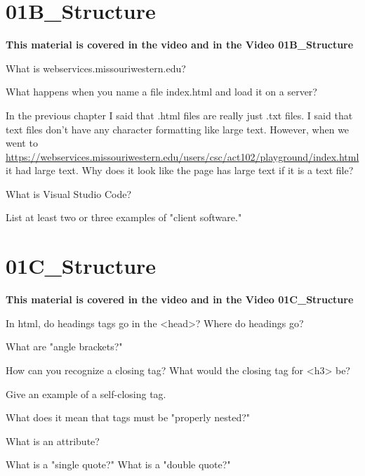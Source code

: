 \documentclass[letterpaper,12pt]{exam}
\begin{document}
\section*{01B\_Structure}
\begin{center}
	\textbf{This material is covered in the video and in the Video 01B\_Structure}
\end{center}
\begin{questions}

\question  What is webservices.missouriwestern.edu?
\vspace{1.5cm}

\question What happens when you name a file index.html and load it on a server? 
\vspace{1.5cm}

\question In the previous chapter I said that .html files are really just .txt files.  I said that text files don't have any character formatting like large text.  
However, when we went to  \url{https://webservices.missouriwestern.edu/users/csc/act102/playground/index.html} it had large text.  Why does it look like the page has large text if it is a text file?
\vspace{1.5cm}

\question What is Visual Studio Code? 
\vspace{1.5cm}

\question List at least two or three examples of "client software." 
\vspace{1.5cm}

\end{questions}



\section*{01C\_Structure}
\begin{center}
	\textbf{This material is covered in the video and in the Video 01C\_Structure}
\end{center}
\begin{questions}

\question In html, do headings tags go in the <head>? Where do headings go?
\vspace{1.5cm}

\question   What are "angle brackets?"
\vspace{1.5cm}

\question How can you recognize a closing tag?  What would the closing tag for <h3> be? 
\vspace{1.5cm}

\question Give an example of a self-closing tag. 
\vspace{1.5cm}

\question What does it mean that tags must be "properly nested?" 
\vspace{1.5cm}

\question What is an attribute? 
\vspace{1.5cm}

\question What is a "single quote?"  What is a "double quote?" 
\vspace{1.5cm}



\end{questions}
\end{document}
